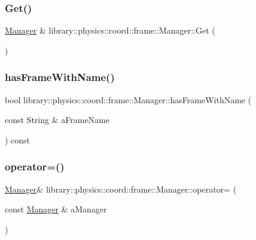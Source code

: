 \subsubsection{\texorpdfstring{Get()}{Get()}}
{\footnotesize\ttfamily \hyperlink{classlibrary_1_1physics_1_1coord_1_1frame_1_1_manager}{Manager} \& library\+::physics\+::coord\+::frame\+::\+Manager\+::\+Get (\begin{DoxyParamCaption}{ }\end{DoxyParamCaption})\hspace{0.3cm}{\ttfamily [static]}}

\mbox{\label{classlibrary_1_1physics_1_1coord_1_1frame_1_1_manager_a842f8a8060172178930aed212c4fcf6d}} 
\subsubsection{\texorpdfstring{has\+Frame\+With\+Name()}{hasFrameWithName()}}
{\footnotesize\ttfamily bool library\+::physics\+::coord\+::frame\+::\+Manager\+::has\+Frame\+With\+Name (\begin{DoxyParamCaption}\item[{const String \&}]{a\+Frame\+Name }\end{DoxyParamCaption}) const}

\mbox{\label{classlibrary_1_1physics_1_1coord_1_1frame_1_1_manager_a187a04c135f48ec850a1fd616dd92a3b}} 
\subsubsection{\texorpdfstring{operator=()}{operator=()}}
{\footnotesize\ttfamily \hyperlink{classlibrary_1_1physics_1_1coord_1_1frame_1_1_manager}{Manager}\& library\+::physics\+::coord\+::frame\+::\+Manager\+::operator= (\begin{DoxyParamCaption}\item[{const \hyperlink{classlibrary_1_1physics_1_1coord_1_1frame_1_1_manager}{Manager} \&}]{a\+Manager }\end{DoxyParamCaption})\hspace{0.3cm}{\ttfamily [delete]}}

